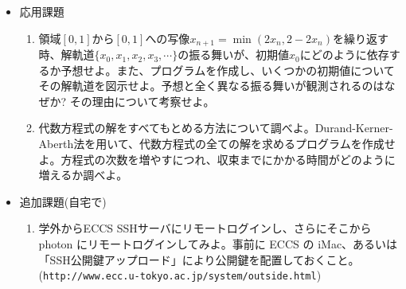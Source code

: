\documentclass[11pt]{jarticle}
\begin{document}
\begin{itemize}
\item 応用課題
  \begin{enumerate}
  \item 領域$[0,1]$から$[0,1]$への写像$x_{n+1} = \min(2x_n,2-2x_n)$を繰り返す時、解軌道$\{x_0,x_1,x_2,x_3,\cdots\}$の振る舞いが、初期値$x_0$にどのように依存するか予想せよ。また、プログラムを作成し、いくつかの初期値についてその解軌道を図示せよ。予想と全く異なる振る舞いが観測されるのはなぜか? その理由について考察せよ。
  \item 代数方程式の解をすべてもとめる方法について調べよ。Durand-Kerner-Aberth法を用いて、代数方程式の全ての解を求めるプログラムを作成せよ。方程式の次数を増やすにつれ、収束までにかかる時間がどのように増えるか調べよ。
  \end{enumerate}  

\item 追加課題(自宅で)
  \begin{enumerate}
  \item 学外からECCS SSHサーバにリモートログインし、さらにそこから photon にリモートログインしてみよ。事前に ECCS の iMac、あるいは「SSH公開鍵アップロード」により公開鍵を配置しておくこと。(\verb+http://www.ecc.u-tokyo.ac.jp/system/outside.html+)
  \end{enumerate}

\end{itemize}
\end{document}
